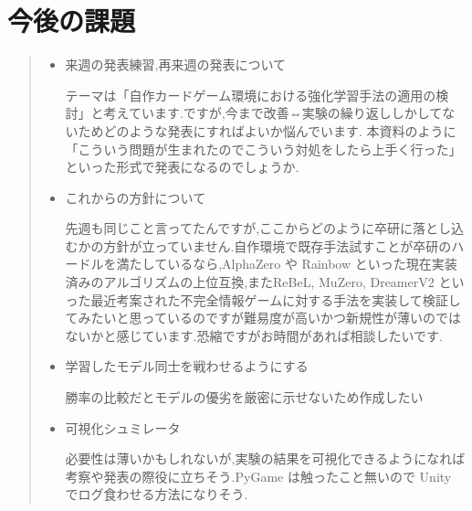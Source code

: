 \documentclass{jarticle}     %
\begin{document}
\section{今後の課題}
\begin{quote}
  \begin{itemize}
   \item 来週の発表練習,再来週の発表について
   \par
   テーマは「自作カードゲーム環境における強化学習手法の適用の検討」と考えています.ですが,今まで改善⇔実験の繰り返ししかしてないためどのような発表にすればよいか悩んでいます. 本資料のように「こういう問題が生まれたのでこういう対処をしたら上手く行った」といった形式で発表になるのでしょうか.

   \item これからの方針について
   \par
   先週も同じこと言ってたんですが,ここからどのように卒研に落とし込むかの方針が立っていません.自作環境で既存手法試すことが卒研のハードルを満たしているなら,AlphaZero や Rainbow といった現在実装済みのアルゴリズムの上位互換,またReBeL\cite{ReBeL}, MuZero\cite{MuZero}, DreamerV2\cite{DreamerV2} といった最近考案された不完全情報ゲームに対する手法を実装して検証してみたいと思っているのですが難易度が高いかつ新規性が薄いのではないかと感じています.恐縮ですがお時間があれば相談したいです.

   \item 学習したモデル同士を戦わせるようにする
   \par
   勝率の比較だとモデルの優劣を厳密に示せないため作成したい

   \item 可視化シュミレータ
   \par
   必要性は薄いかもしれないが,実験の結果を可視化できるようになれば考察や発表の際役に立ちそう.PyGame は触ったこと無いので Unity でログ食わせる方法になりそう.
  \end{itemize}
 \end{quote}



\end{document}
